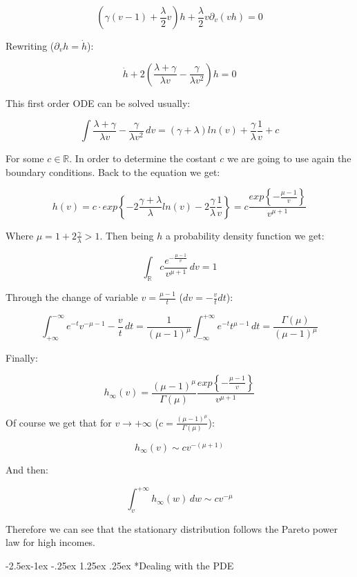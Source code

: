 \documentclass[12pt,a4paper]{article}
\makeatletter
\renewcommand\paragraph{\@startsection{paragraph}{0}{\z@}%
            {-2.5ex\@plus -1ex \@minus -.25ex}%
            {1.25ex \@plus .25ex}%
            {\normalfont\normalsize\bfseries}}
\numberwithin{theorem}{section}
\numberwithin{definition}{section}
\numberwithin{example}{section}
\numberwithin{exercise}{section}
\newcommand{\R}{\mathbb{R}}
\makeatother
\begin{document}
\[\left(\gamma(v-1)+\frac{\lambda}{2}v\right)h+\frac{\lambda}{2}v\partial_v(vh)=0\]

Rewriting ($\partial_vh=\dot{h}$):

\[\dot{h}+2\left(\frac{\lambda+\gamma}{\lambda v}-\frac{\gamma}{\lambda v^2}\right)h=0\]

This first order ODE can be solved usually:

\[\int \frac{\lambda+\gamma}{\lambda v}-\frac{\gamma}{\lambda v^2} \,dv = (\gamma+\lambda)ln(v)+\frac{\gamma}{\lambda}\frac{1}{v} +c \]

For some $c\in\R$. In order to determine the costant $c$ we are going to use again the boundary conditions. Back to the equation we get:

\[h(v) = c\cdot exp\left\{-2\frac{\gamma+\lambda}{\lambda}ln(v)-2\frac{\gamma}{\lambda}\frac{1}{v}\right\} = c\frac{exp\left\{-\frac{\mu-1}{v}\right\}}{v^{\mu+1}}\]

Where $\mu=1+2\frac{\gamma}{\lambda}>1$. Then being $h$ a probability density function we get:

\[\int_{\R}c\frac{e^{-\frac{\mu-1}{v}}}{v^{\mu+1}} \,dv=1 \]

Through the change of variable $v=\frac{\mu-1}{t}$ ($dv=-\frac{v}{t}dt$):

\[\int_{+\infty}^{-\infty} e^{-t}v^{-\mu-1}-\frac{v}{t} \,dt=\frac{1}{(\mu-1)^{\mu}}\int_{-\infty}^{+\infty}e^{-t}t^{\mu-1} \,dt=\frac{\Gamma(\mu)}{(\mu-1)^{\mu}}\]

Finally:

\begin{equation}
    h_{\infty}(v)=\frac{(\mu-1)^{\mu}}{\Gamma(\mu)}\frac{exp\left\{-\frac{\mu-1}{v}\right\}}{v^{\mu+1}}
\end{equation}

Of course we get that for $v\to+\infty$ ($c=\frac{(\mu-1)^{\mu}}{\Gamma(\mu)}$):



\[h_{\infty}(v)\sim cv^{-(\mu+1)}\]

And then:

\[\int_v^{+\infty} h_{\infty}(w) \,dw \sim cv^{-\mu}\]

Therefore we can see that the stationary distribution follows the Pareto power law for high incomes.


\paragraph*{Dealing with the PDE}
\end{document}
